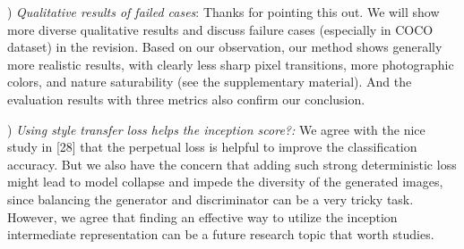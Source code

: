 \documentclass[10pt,twocolumn,letterpaper]{article}
\begin{document}
) \textit{Qualitative results of failed cases}: Thanks for pointing this out. We will show more diverse qualitative results and discuss failure cases (especially in COCO dataset) in the revision. Based on our observation, our method shows generally more realistic results, with clearly less sharp pixel transitions, more photographic colors, and nature saturability (see the supplementary material). And the evaluation results with three metrics also confirm our conclusion.



) \textit{Using style transfer loss helps the inception score?:} 
We agree with the nice study in [28] that the perpetual loss is helpful to improve the classification accuracy.
But we also have the concern that adding such strong deterministic loss might lead to model collapse and impede the diversity of the generated images, since balancing the generator and discriminator can be a very tricky task. However, we agree that finding an effective way to utilize the inception intermediate representation can be a future research topic that worth studies. 
 


\end{document}
